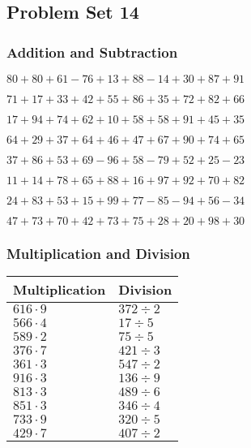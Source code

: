 \hypertarget{problem-set-14}{%
\subsection{Problem Set 14}\label{problem-set-14}}

\hypertarget{addition-and-subtraction}{%
\subsubsection{Addition and
Subtraction}\label{addition-and-subtraction}}

\(80+80+61-76+13+88-14+30+87+91\)

\(71+17+33+42+55+86+35+72+82+66\)

\(17+94+74+62+10+58+58+91+45+35\)

\(64+29+37+64+46+47+67+90+74+65\)

\(37+86+53+69-96+58-79+52+25-23\)

\(11+14+78+65+88+16+97+92+70+82\)

\(24+83+53+15+99+77-85-94+56-34\)

\(47+73+70+42+73+75+28+20+98+30\)

\hypertarget{multiplication-and-division}{%
\subsubsection{Multiplication and
Division}\label{multiplication-and-division}}

\begin{longtable}[]{@{}ll@{}}
\toprule
Multiplication & Division\tabularnewline
\midrule
\endhead
\(616\cdot9\) & \(372÷2\)\tabularnewline
\(566\cdot4\) & \(17÷5\)\tabularnewline
\(589\cdot2\) & \(75÷5\)\tabularnewline
\(376\cdot7\) & \(421÷3\)\tabularnewline
\(361\cdot3\) & \(547÷2\)\tabularnewline
\(916\cdot3\) & \(136÷9\)\tabularnewline
\(813\cdot3\) & \(489÷6\)\tabularnewline
\(851\cdot3\) & \(346÷4\)\tabularnewline
\(733\cdot9\) & \(320÷5\)\tabularnewline
\(429\cdot7\) & \(407÷2\)\tabularnewline
\bottomrule
\end{longtable}
